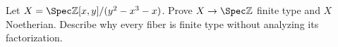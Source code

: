 \begin{problem}\label{chal:vi26-04}
Let $X=\Spec \mathbb Z[x,y]/(y^2-x^3-x)$.  Prove $X\to\Spec\mathbb Z$ finite type and $X$ Noetherian.  Describe why every fiber is finite type without analyzing its factorization.
\end{problem}
